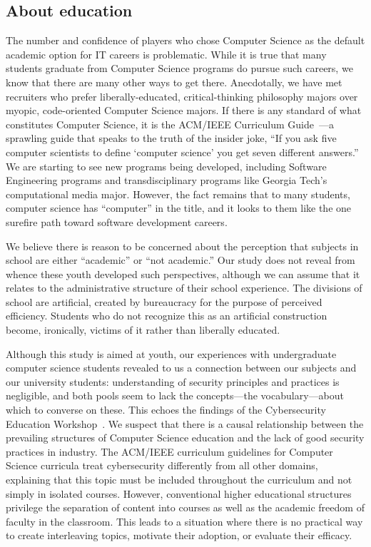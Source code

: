 \documentclass[letterpaper]{article}
\begin{document}
\subsection{About education}

The number and confidence of players who chose Computer Science
as the default academic option for IT careers is problematic.
While it is true that many students graduate from Computer Science
programs do pursue such careers, we know that there are many other
ways to get there. Anecdotally, we have met recruiters who prefer
liberally-educated, critical-thinking philosophy majors over 
myopic, code-oriented Computer Science majors.
If there is any standard of what constitutes Computer Science,
it is the ACM/IEEE Curriculum Guide~\citep{CS2013}---a sprawling
guide that speaks to the truth of the insider joke, ``If you ask
five computer scientists to define `computer science' you get
seven different answers.''
We are starting to see new programs being developed, including
Software Engineering programs and transdisciplinary programs like
Georgia Tech's computational media major. However, the fact remains
that to many students, computer science has ``computer'' in the title,
and it looks to them like the one surefire path toward software
development careers.

We believe there is reason to be concerned about the perception that
subjects in school are either ``academic'' or ``not academic.''
Our study does not reveal from whence these youth developed
such perspectives, although we can assume that it relates to the
administrative structure of their school experience.
The divisions of school are artificial, created by bureaucracy for
the purpose of perceived efficiency.
Students who do not recognize this as an artificial construction 
become, ironically, victims of it rather than liberally educated.

Although this study is aimed at youth, our experiences with
undergraduate computer science students revealed to us a connection
between our subjects and our university students: 
understanding of security principles and practices is negligible, 
and both pools seem to lack the concepts---the vocabulary---about
which to converse on these. This echoes the findings of the 
Cybersecurity Education Workshop~\citep{Cybersecurity2014}.
We suspect that there is a causal relationship between the
prevailing structures of Computer Science education and the lack
of good security practices in industry. The ACM/IEEE curriculum
guidelines for Computer Science curricula treat cybersecurity differently
from all other domains, explaining that this topic must be included
throughout the curriculum and not simply in isolated courses.
However, conventional higher educational structures privilege the
separation of content into courses as well as the academic freedom
of faculty in the classroom. This leads to a situation where there is
no practical way to create interleaving topics, motivate their adoption,
or evaluate their efficacy. 
\end{document}
